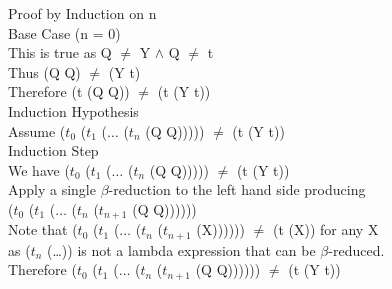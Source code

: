 \documentclass{jhwhw}
\begin{document}
	\bigbreak
	\setlength\parindent{0pt}
	Proof by Induction on n \\
	\setlength\parindent{24pt}
		Base Case (n = 0) \\
		\setlength\parindent{48pt}
		This is true as Q $\neq$ Y $\wedge$ Q $\neq$ t \\
		Thus (Q Q) $\neq$ (Y t) \\
		Therefore (t (Q Q)) $\neq $ (t (Y t)) \\
		\setlength\parindent{24pt}
		Induction Hypothesis \\
		\setlength\parindent{48pt}
		Assume ($t_0$ ($t_1$ ($\ldots$ ($t_n$ (Q Q))))) $\neq$ (t (Y t)) \\
		\setlength\parindent{24pt}
		Induction Step \\
		\setlength\parindent{48pt}
		We have ($t_0$ ($t_1$ ($\ldots$ ($t_n$ (Q Q))))) $\neq$ (t (Y t)) \\
		Apply a single $\beta$-reduction to the left hand side producing \\
		($t_0$ ($t_1$ ($\ldots$ ($t_n$ ($t_{n+1}$ (Q Q)))))) \\
		Note that ($t_0$ ($t_1$ ($\ldots$ ($t_n$ ($t_{n+1}$ (X)))))) $\neq$ (t (X)) for any X \\
		as ($t_n$ (\ldots)) is not a lambda expression that can be $\beta$-reduced. \\
		Therefore ($t_0$ ($t_1$ ($\ldots$ ($t_n$ ($t_{n+1}$ (Q Q)))))) $\neq$ (t (Y t)) \square\\
\end{document}
